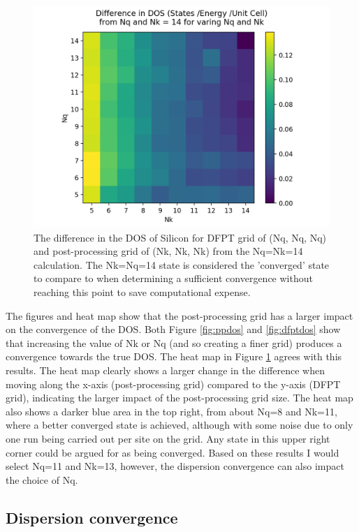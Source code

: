 \documentclass[12pt]{article}
\begin{document}
\begin{figure}[!htpb]
	\centering
	\includegraphics[width=12cm]{../Figures/mat_dos.png}
	\caption{The difference in the DOS of Silicon for DFPT grid of (Nq, Nq, Nq) and post-processing grid of (Nk, Nk, Nk) from the Nq=Nk=14 calculation. The Nk=Nq=14 state is considered the 'converged' state to compare to when determining a sufficient convergence without reaching this point to save computational expense.}
	\label{fig:matdos}
\end{figure}

\bigskip

\noindent The figures and heat map show that the post-processing grid has a larger impact on the convergence of the DOS. Both Figure \ref{fig:ppdos} and \ref{fig:dfptdos} show that increasing the value of Nk or Nq (and so creating a finer grid) produces a convergence towards the true DOS. The heat map in Figure \ref{fig:matdos} agrees with this results. The heat map clearly shows a larger change in the difference when moving along the x-axis (post-processing grid) compared to the y-axis (DFPT grid), indicating the larger impact of the post-processing grid size.  The heat map also shows a darker blue area in the top right, from about Nq=8 and Nk=11, where a better converged state is achieved, although with some noise due to only one run being carried out per site on the grid. Any state in this upper right corner could be argued for as being converged. Based on these results I would select Nq=11 and Nk=13, however, the dispersion convergence can also impact the choice of Nq.


\subsection*{Dispersion convergence}
\end{document}

